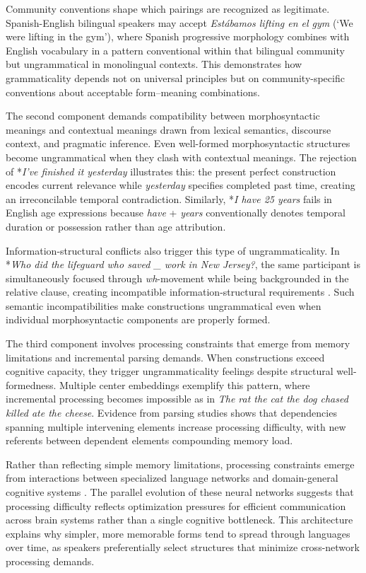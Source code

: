 \documentclass[12pt]{article}
\begin{document}
Community conventions shape which pairings are recognized as legitimate. Spanish-English bilingual speakers may accept \textit{Estábamos lifting en el gym} (`We were lifting in the gym'), where Spanish progressive morphology combines with English vocabulary in a pattern conventional within that bilingual community but ungrammatical in monolingual contexts. This demonstrates how grammaticality depends not on universal principles but on community-specific conventions about acceptable form–meaning combinations.

The second component demands compatibility between morphosyntactic meanings and contextual meanings drawn from lexical semantics, discourse context, and pragmatic inference. Even well-formed morphosyntactic structures become ungrammatical when they clash with contextual meanings. The rejection of *\textit{I've finished it yesterday} illustrates this: the present perfect construction encodes current relevance while \textit{yesterday} specifies completed past time, creating an irreconcilable temporal contradiction. Similarly, *\textit{I have 25 years} fails in English age expressions because \textit{have} + \textit{years} conventionally denotes temporal duration or possession rather than age attribution.

Information-structural conflicts also trigger this type of ungrammaticality. In *\textit{Who did the lifeguard who saved \_ work in New Jersey?}, the same participant is simultaneously focused through \textit{wh}-movement while being backgrounded in the relative clause, creating incompatible information-structural requirements \parencite{CuneoGoldberg2023}. Such semantic incompatibilities make constructions ungrammatical even when individual morphosyntactic components are properly formed.

The third component involves processing constraints that emerge from memory limitations and incremental parsing demands. When constructions exceed cognitive capacity, they trigger ungrammaticality feelings despite structural well-formedness. Multiple center embeddings exemplify this pattern, where incremental processing becomes impossible as in \textit{The rat the cat the dog chased killed ate the cheese}. Evidence from parsing studies \parencite{gibson2000} shows that dependencies spanning multiple intervening elements increase processing difficulty, with new referents between dependent elements compounding memory load.

Rather than reflecting simple memory limitations, processing constraints emerge from interactions between specialized language networks and domain-general cognitive systems \parencite{Fedorenko2024}. The parallel evolution of these neural networks suggests that processing difficulty reflects optimization pressures for efficient communication across brain systems rather than a single cognitive bottleneck. This architecture explains why simpler, more memorable forms tend to spread through languages over time, as speakers preferentially select structures that minimize cross-network processing demands.
\end{document}
